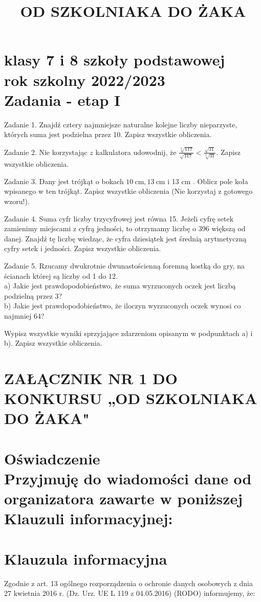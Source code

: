 \documentclass[10pt]{article}
\title{OD SZKOLNIAKA DO ŻAKA }
\author{}
\date{}
\begin{document}
\maketitle
\section*{klasy 7 i 8 szkoły podstawowej \\
 rok szkolny 2022/2023 \\
 Zadania - etap I}
Zadanie 1. Znajdź cztery najmniejsze naturalne kolejne liczby nieparzyste, których suma jest podzielna przez 10. Zapisz wszystkie obliczenia.

Zadanie 2. Nie korzystając \(z\) kalkulatora udowodnij, że \(\frac{\sqrt[3]{117}}{\sqrt{117}}<\frac{\sqrt{31}}{\sqrt[3]{31}}\). Zapisz wszystkie obliczenia.

Zadanie 3. Dany jest trójkąt o bokach \(10 \mathrm{~cm}, 13 \mathrm{~cm}\) i 13 cm . Oblicz pole koła wpisanego w ten trójkąt. Zapisz wszystkie obliczenia (Nie korzystaj z gotowego wzoru!).

Zadanie 4. Suma cyfr liczby trzycyfrowej jest równa 15. Jeżeli cyfrę setek zamienimy miejscami z cyfrą jedności, to otrzymamy liczbę o 396 większą od danej. Znajdź tę liczbę wiedząc, że cyfra dziesiątek jest średnią arytmetyczną cyfry setek i jedności. Zapisz wszystkie obliczenia.

Zadanie 5. Rzucamy dwukrotnie dwunastościenną foremną kostką do gry, na ścianach której są liczby od 1 do 12.\\
a) Jakie jest prawdopodobieństwo, że suma wyrzuconych oczek jest liczbą podzielną przez 3?\\
b) Jakie jest prawdopodobieństwo, że iloczyn wyrzuconych oczek wynosi co najmniej 64?

Wypisz wszystkie wyniki sprzyjające zdarzeniom opisanym w podpunktach a) i b). Zapisz wszystkie obliczenia.

\section*{ZAŁĄCZNIK NR 1 DO KONKURSU „OD SZKOLNIAKA DO ŻAKA"}
\section*{Oświadczenie \\
 Przyjmuję do wiadomości dane od organizatora zawarte w poniższej Klauzuli informacyjnej:}
\section*{Klauzula informacyjna}
Zgodnie z art. 13 ogólnego rozporządzenia o ochronie danych osobowych z dnia 27 kwietnia 2016 r. (Dz. Urz. UE L 119 z 04.05.2016) (RODO) informujemy, że:
\end{document}
